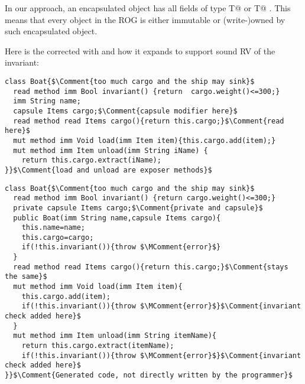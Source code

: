 In our approach, an encapsulated object has all fields of type \Q@imm T@ or \Q@capsule T@ .
This means that every object in the ROG is either immutable or (write-)owned
by such encapsulated object.

\noindent Here is the corrected \Q@Boat@ with \Q@cargo@ and how it expands to support sound RV of the invariant:


\begin{lstlisting}
class Boat{$\Comment{too much cargo and the ship may sink}$
  read method imm Bool invariant() {return  cargo.weight()<=300;}
  imm String name;
  capsule Items cargo;$\Comment{capsule modifier here}$
  read method read Items cargo(){return this.cargo;}$\Comment{read here}$
  mut method imm Void load(imm Item item){this.cargo.add(item);} 
  mut method imm Item unload(imm String iName) {
    return this.cargo.extract(iName);
}}$\Comment{load and unload are exposer methods}$
\end{lstlisting}
\begin{lstlisting}
class Boat{$\Comment{too much cargo and the ship may sink}$
  read method imm Bool invariant() {return cargo.weight()<=300;}
  private capsule Items cargo;$\Comment{private and capsule}$
  public Boat(imm String name,capsule Items cargo){
    this.name=name;
    this.cargo=cargo;
    if(!this.invariant()){throw $\MComment{error}$}
  }
  read method read Items cargo(){return this.cargo;}$\Comment{stays the same}$
  mut method imm Void load(imm Item item){
    this.cargo.add(item);
    if(!this.invariant()){throw $\MComment{error}$}$\Comment{invariant check added here}$
  } 
  mut method imm Item unload(imm String itemName){
    return this.cargo.extract(itemName);
    if(!this.invariant()){throw $\MComment{error}$}$\Comment{invariant check added here}$
}}$\Comment{Generated code, not directly written by the programmer}$
\end{lstlisting}